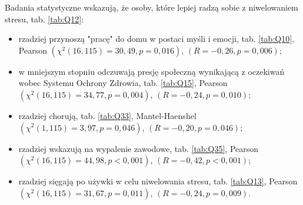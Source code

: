 \documentclass[a4paper,12pt,twoside,openright]{mwrep}
\begin{document}

Badania statystyczne wskazują, że osoby, które lepiej radzą sobie z niwelowaniem stresu, tab. \ref{tab:Q12}:
	\begin{itemize}
		\item rzadziej przynoszą "pracę" do domu w postaci myśli i emocji, tab. \ref{tab:Q10}, Pearson $(\chi^2 (16, 115) = 30,49, p = 0,016)$,  $(R = -0,26, p = 0,006)$;
		\item w mniejszym stopniu odczuwają presję społeczną wynikającą z oczekiwań wobec Systemu Ochrony Zdrowia, tab. \ref{tab:Q15},  Pearson $(\chi^2 (16, 115) = 34,77, p = 0,004)$, $(R = -0,24, p = 0,010)$;
		\item rzadziej chorują, tab. \ref{tab:Q33}, Mantel-Haenshel $(\chi^2 (1, 115) = 3,97, p = 0,046)$, $(R = -0,20, p = 0,046)$;
		\item rzadziej wskazują na wypalenie zawodowe, tab. \ref{tab:Q35}, Pearson $(\chi^2 (16, 115) = 44,98, p < 0,001)$, $(R = -0,42, p < 0,001)$;
		\item rzadziej sięgają po używki w celu niwelowania stresu, tab. \ref{tab:Q13}, Pearson $(\chi^2 (16, 115) = 31,67, p = 0,011)$, $(R = -0,24, p = 0,009)$.
	\end{itemize}
	



	

	
	
	





%

%
\end{document}

